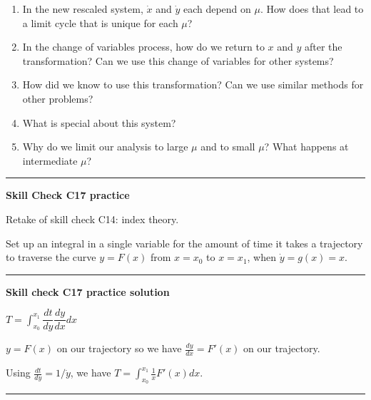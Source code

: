 \documentclass[12pt,letterpaper,noanswers]{exam}
\begin{document}
\begin{enumerate}
\item In the new rescaled system, $\dot x$ and $\dot y$ each depend on $\mu$.  How does that lead to a limit cycle that is unique for each $\mu$?

\item In the change of variables process, how do we return to $x$ and $y$ after the transformation?  Can we use this change of variables for other systems?

\item How did we know to use this transformation?  Can we use similar methods for other problems?

\item What is special about this system?  

\item Why do we limit our analysis to large $\mu$ and to small $\mu$?  What happens at intermediate $\mu$?

\end{enumerate}


\vspace{0.2cm}
\hrule
\vspace{0.2cm}

\noindent\textbf{Skill Check C17 practice}
\begin{questions}
\item Retake of skill check C14: index theory.

\item Set up an integral in a single variable for the amount of time it takes a trajectory to traverse the curve $y = F(x)$ from $x = x_0$ to $x = x_1$, when $\dot y = g(x) = x$.

\vspace{0.2cm}

\hrule
\vspace{0.2cm}
\end{questions}



\noindent\textbf{Skill check C17 practice solution}


$\displaystyle T = \int_{x_0}^{x_1} \dfrac{dt}{dy}\dfrac{dy}{dx}dx$ 

$y = F(x)$ on our trajectory so we have $\frac{dy}{dx} = F'(x)$ on our trajectory.

Using $\frac{dt}{dy} = 1/\dot y$, we have
$\displaystyle T = \int_{x_0}^{x_1} \frac{1}{x}F'(x)dx$.


\vspace{0.2cm}
\hrule
\vspace{0.2cm}
\end{document}
